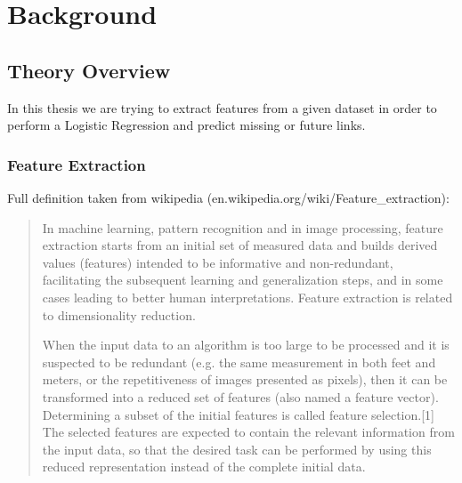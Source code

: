 
\chapter{Background}

\section{Theory Overview}
In this thesis we are trying to extract features from a given dataset in order to perform a Logistic Regression and predict missing or future links. 





\subsection{Feature Extraction}
Full definition taken from wikipedia (en.wikipedia.org/wiki/Feature\_extraction): 
\begin{quote} 
In machine learning, pattern recognition and in image processing, feature extraction starts from an initial set of measured data and builds derived values (features) intended to be informative and non-redundant, facilitating the subsequent learning and generalization steps, and in some cases leading to better human interpretations. Feature extraction is related to dimensionality reduction.

When the input data to an algorithm is too large to be processed and it is suspected to be redundant (e.g. the same measurement in both feet and meters, or the repetitiveness of images presented as pixels), then it can be transformed into a reduced set of features (also named a feature vector). Determining a subset of the initial features is called feature selection.[1] The selected features are expected to contain the relevant information from the input data, so that the desired task can be performed by using this reduced representation instead of the complete initial data.
\end{quote}

